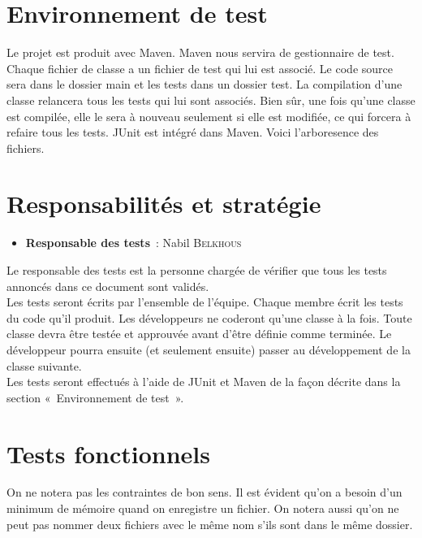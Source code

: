\documentclass[hidelinks, a4paper,11pt,twoside,final]{article}
\begin{document}
\section{Environnement de test}
    Le projet est produit avec Maven. Maven nous servira de gestionnaire de test. Chaque fichier de classe a un fichier de test qui lui est associé.
    Le code source sera dans le dossier main et les tests dans un dossier test. La compilation d’une classe relancera tous les tests qui lui sont associés.
    Bien sûr, une fois qu’une classe est compilée, elle le sera à nouveau seulement si elle est modifiée, ce qui forcera à refaire tous les tests.
    JUnit est intégré dans Maven. Voici l’arboresence des fichiers.

\section{Responsabilités et stratégie}
  \begin{itemize}
   \item \textbf{Responsable des tests}~: Nabil \textsc{Belkhous}
  \end{itemize}
  Le responsable des tests est la personne chargée de vérifier que tous les tests annoncés dans ce document sont validés.\\
  Les tests seront écrits par l’ensemble de l’équipe. Chaque membre écrit les tests du code qu’il produit. Les développeurs ne coderont qu’une classe à la fois.
  Toute classe devra être testée et approuvée avant d’être définie comme terminée. Le développeur pourra ensuite (et seulement ensuite) passer
  au développement de la classe suivante.\\
  Les tests seront effectués à l’aide de JUnit et Maven de la façon décrite dans la section «~Environnement de test~».

\section{Tests fonctionnels}
  On ne notera pas les contraintes de bon sens. Il est évident qu’on a besoin d’un minimum de mémoire quand on enregistre un fichier. On notera aussi qu’on ne peut pas nommer deux
  fichiers avec le même nom s’ils sont dans le même dossier.
\end{document}
